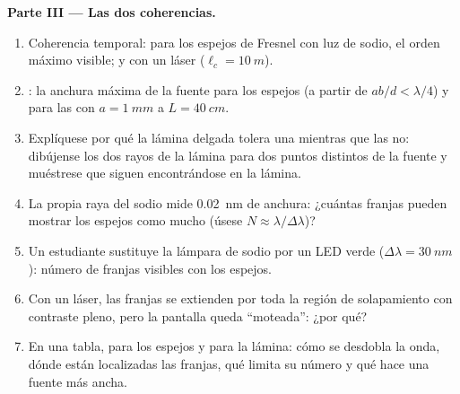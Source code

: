 \begin{problem}
\medskip
\noindent\textbf{Parte III --- Las dos coherencias.}
\begin{enumerate}[resume]
  \item Coherencia temporal: para los espejos de Fresnel con luz de sodio,
        el orden máximo visible; y con un láser ($\ell_c = \qty{10}{m}$).
  \item {}: la anchura máxima de la fuente para los espejos
        (a partir de $ab/d < \lambda/4$) y para las  con $a = \qty{1}{mm}$ a
        $L = \qty{40}{cm}$.
  \item Explíquese por qué la lámina delgada tolera una  mientras que
        las  no: dibújense los dos rayos de la lámina para dos
        puntos distintos de la fuente y muéstrese que siguen encontrándose en la lámina.
  \item La propia raya del sodio mide \qty{0.02}{nm} de anchura: ¿cuántas franjas
        pueden mostrar los espejos como mucho (úsese $N \approx \lambda/\Delta\lambda$)?
  \item Un estudiante sustituye la lámpara de sodio por un LED verde ($\Delta\lambda =
        \qty{30}{nm}$): número de franjas visibles con los espejos.
  \item Con un láser, las franjas se extienden por toda la región de solapamiento
        con contraste pleno, pero la pantalla queda ``moteada'': ¿por qué?
  \item En una tabla, para los espejos y para la lámina: cómo se desdobla la
        onda, dónde están localizadas las franjas, qué limita su
        número y qué hace una fuente más ancha.
\end{enumerate}
\end{problem}
